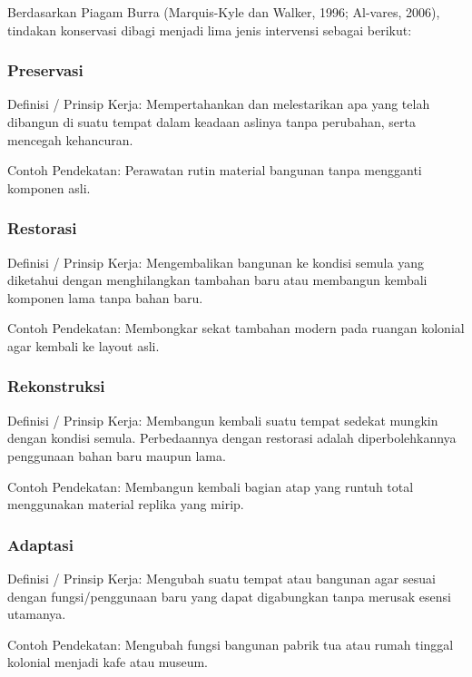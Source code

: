 \documentclass[../rumukota.tex]{subfiles}
\begin{document}
Berdasarkan Piagam Burra (Marquis-Kyle dan Walker, 1996; Al-vares, 2006), tindakan konservasi dibagi menjadi lima jenis intervensi sebagai berikut:

\subsubsection{Preservasi}%
\label{ssub:preservasi}


Definisi / Prinsip Kerja: Mempertahankan dan melestarikan apa yang telah dibangun di suatu tempat dalam keadaan aslinya tanpa perubahan, serta mencegah kehancuran.

Contoh Pendekatan: Perawatan rutin material bangunan tanpa mengganti komponen asli.

\subsubsection{Restorasi}%
\label{ssub:restorasi}


Definisi / Prinsip Kerja: Mengembalikan bangunan ke kondisi semula yang diketahui dengan menghilangkan tambahan baru atau membangun kembali komponen lama tanpa bahan baru.

Contoh Pendekatan: Membongkar sekat tambahan modern pada ruangan kolonial agar kembali ke layout asli.

\subsubsection{Rekonstruksi}%
\label{ssub:rekonstruksi}


Definisi / Prinsip Kerja: Membangun kembali suatu tempat sedekat mungkin dengan kondisi semula. Perbedaannya dengan restorasi adalah diperbolehkannya penggunaan bahan baru maupun lama.

Contoh Pendekatan: Membangun kembali bagian atap yang runtuh total menggunakan material replika yang mirip.

\subsubsection{Adaptasi}%
\label{ssub:adaptasi}

Definisi / Prinsip Kerja: Mengubah suatu tempat atau bangunan agar sesuai dengan fungsi/penggunaan baru yang dapat digabungkan tanpa merusak esensi utamanya.

Contoh Pendekatan: Mengubah fungsi bangunan pabrik tua atau rumah tinggal kolonial menjadi kafe atau museum.
\end{document}
